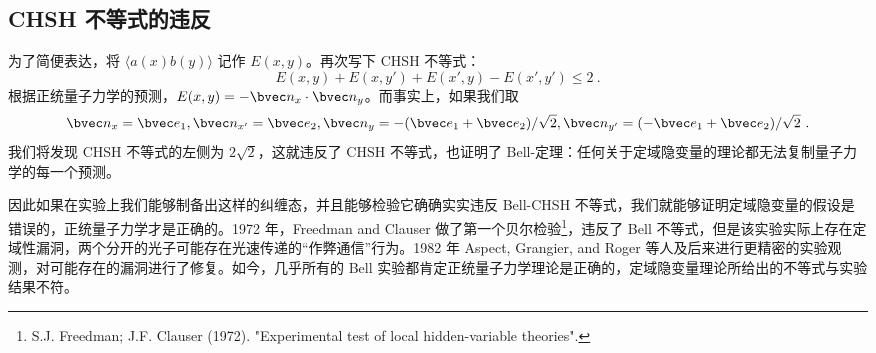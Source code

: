 \subsection{CHSH 不等式的违反}
为了简便表达，将 $\langle a(x)b(y)\rangle$ 记作 $E(x,y)$。再次写下 CHSH 不等式：
\begin{equation}
E(x,y)+E(x,y')+E(x',y)-E(x',y')\le 2~.
\end{equation}
根据正统量子力学的预测，$E(x,y)=-\bvec n_x\cdot \bvec n_y$。而事实上，如果我们取
\begin{equation}
\bvec n_x=\bvec e_1,
\bvec n_{x'}=\bvec e_2,
\bvec n_y=-(\bvec e_1+\bvec e_2)/\sqrt{2},
\bvec n_{y'}=(-\bvec e_1+\bvec e_2)/\sqrt{2}~.
\end{equation}
我们将发现 CHSH 不等式的左侧为 $2\sqrt{2}$，这就违反了 CHSH 不等式，也证明了 Bell-定理：任何关于定域隐变量的理论都无法复制量子力学的每一个预测。

因此如果在实验上我们能够制备出这样的纠缠态，并且能够检验它确确实实违反 Bell-CHSH 不等式，我们就能够证明定域隐变量的假设是错误的，正统量子力学才是正确的。1972 年，Freedman and Clauser 做了第一个贝尔检验\footnote{S.J. Freedman; J.F. Clauser (1972). "Experimental test of local hidden-variable theories".}，违反了 Bell 不等式，但是该实验实际上存在定域性漏洞，两个分开的光子可能存在光速传递的“作弊通信”行为。1982 年 Aspect, Grangier, and Roger 等人及后来进行更精密的实验观测，对可能存在的漏洞进行了修复。如今，几乎所有的 Bell 实验都肯定正统量子力学理论是正确的，定域隐变量理论所给出的不等式与实验结果不符。